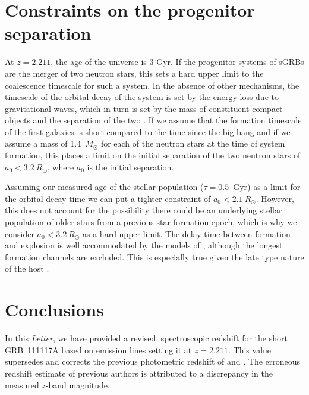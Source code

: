 \documentclass{aa}    %
\begin{document}
\section{Constraints on the progenitor separation}

At $z = 2.211$, the age of the universe is 3 Gyr. If the progenitor systems
of sGRBs are the merger of two neutron stars, this sets a hard upper limit to
the coalescence timescale for such a system. In the absence of other mechanisms,
the timescale of the orbital decay of the system is set by the energy loss due
to gravitational waves, which in turn is set by the mass of constituent compact
objects and the separation of the two \citep{Postnov2014}. If we assume that the
formation timescale of the first galaxies is short compared to the time since
the big bang \citep{Richard2011} and if we assume a mass of 1.4~$M_\odot$ for
each of the neutron stars at the time of system formation, this places a limit
on the initial separation of the two neutron stars of $a_0 < 3.2~R_\odot$,
where $a_0$ is the initial separation.

Assuming our measured age of the stellar population ($\tau = 0.5$~Gyr) as a
limit for the orbital decay time we can put a tighter constraint of $a_0 < 2.1~R_\odot$. 
However, this does not account for the possibility there could be an
underlying stellar population of older stars from a previous star-formation
epoch, which is why we consider $a_0 < 3.2~R_\odot$ as a hard upper limit. The
delay time between formation and explosion is well accommodated by the models of
\citet{Belczynski2006}, although the longest formation channels are excluded.
This is especially true given the late type nature of the host
\citep{OShaughnessy2008}.

\section{Conclusions}

In this \emph{Letter}, we have provided a revised, spectroscopic redshift for the short
GRB~111117A based on emission lines %
setting it at $z = 2.211$. This value supersedes and corrects the previous
photometric redshift of \citet{Margutti2012} and \citet{Sakamoto2013}. The erroneous redshift estimate of previous authors is attributed to a discrepancy in the measured $z$-band magnitude.
\end{document}
